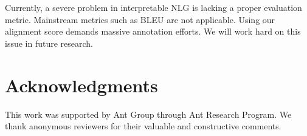 \documentclass[letterpaper]{article} %
\begin{document}
	Currently, a severe problem in interpretable NLG is lacking a proper evaluation metric. Mainstream metrics such as BLEU are not applicable. Using our alignment score demands massive annotation efforts. We will work hard on this issue in future research.
	
\section*{Acknowledgments}
	
	This work was supported by Ant Group through Ant Research Program. We thank anonymous reviewers for their valuable and constructive comments.
	
	
	
	
\end{document}
